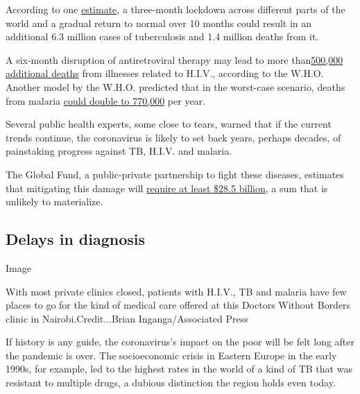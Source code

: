 According to one
\href{http://www.stoptb.org/assets/documents/news/Modeling\%20Report_1\%20May\%202020_FINAL.pdf}{estimate},
a three-month lockdown across different parts of the world and a gradual
return to normal over 10 months could result in an additional 6.3
million cases of tuberculosis and 1.4 million deaths from it.

A six-month disruption of antiretroviral therapy may lead to more
than\href{https://www.who.int/news-room/detail/11-05-2020-the-cost-of-inaction-covid-19-related-service-disruptions-could-cause-hundreds-of-thousands-of-extra-deaths-from-hiv}{500,000
additional deaths} from illnesses related to H.I.V., according to the
W.H.O. Another model by the W.H.O. predicted that in the worst-case
scenario, deaths from malaria
\href{https://www.who.int/publications/i/item/the-potential-impact-of-health-service-disruptions-on-the-burden-of-malaria}{could
double to 770,000} per year.

Several public health experts, some close to tears, warned that if the
current trends continue, the coronavirus is likely to set back years,
perhaps decades, of painstaking progress against TB, H.I.V. and malaria.

The Global Fund, a public-private partnership to fight these diseases,
estimates that mitigating this damage will
\href{https://www.theglobalfund.org/en/news/2020-06-24-global-fund-covid-19-report-deaths-from-hiv-tb-and-malaria-could-almost-double-in-12-months-unless-urgent-action-is-taken/}{require
at least \$28.5 billion}, a sum that is unlikely to materialize.

\hypertarget{delays-in-diagnosis}{%
\subsection{Delays in diagnosis}\label{delays-in-diagnosis}}

Image

With most private clinics closed, patients with H.I.V., TB and malaria
have few places to go for the kind of medical care offered at this
Doctors Without Borders clinic in Nairobi.Credit...Brian
Inganga/Associated Press

If history is any guide, the coronavirus's impact on the poor will be
felt long after the pandemic is over. The socioeconomic crisis in
Eastern Europe in the early 1990s, for example, led to the highest rates
in the world of a kind of TB that was resistant to multiple drugs, a
dubious distinction the region holds even today.

